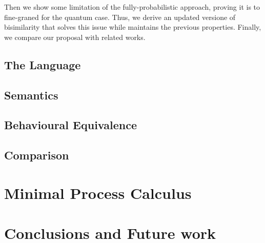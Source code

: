 \documentclass[10pt,a4paper, titlepage]{report}
\theoremstyle{remark}
\begin{document}
Then we show some limitation of the fully-probabilistic approach, proving it is to fine-graned for the quantum case. Thus, we derive an updated versione of bisimilarity that solves this issue while maintains the previous properties. Finally, we compare our proposal with related works.

\section{The Language}


\section{Semantics}





\section{Behavioural Equivalence}\label{bisimulation_chapter4}





\section{Comparison}




\chapter{Minimal Process Calculus}


\chapter{Conclusions and Future work}

\printbibliography[
heading=bibintoc,
title={Bibliography}
]
\end{document}
